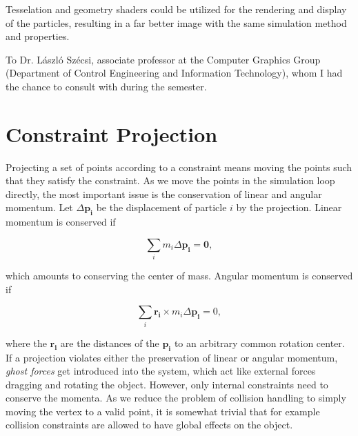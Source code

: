 \documentclass[sigplan,screen,nonacm]{acmart}
\renewcommand{\b}{\boldsymbol}
\begin{document}
Tesselation and geometry shaders could be utilized for the rendering and display
of the particles, resulting in a far better image with the same simulation
method and properties.

\begin{acks}
    To Dr. László Szécsi, associate professor at the Computer Graphics Group
    (Department of Control Engineering and Information Technology), whom I had
    the chance to consult with during the semester.
\end{acks}




\appendix

\section{Constraint Projection} \label{appendix:ConstraintProjection}
Projecting a set of points according to a constraint means moving the points
such that they satisfy the constraint. As we move the points in the
simulation loop directly, the most important issue is the conservation of linear and
angular momentum. Let $\Delta \b{p_i}$ be the displacement of particle $i$ by the
projection. Linear momentum is conserved if 

\begin{equation}
    \label{eq:linear_momentum}
    \sum\limits_{i} m_i \Delta \b{p_i} = \b{0},
\end{equation}

which amounts to conserving the center of mass. Angular momentum is conserved if

\begin{equation}
    \label{eq:angular_momentum}
    \sum\limits_{i} \b{r_i} \times m_i \Delta \b{p_i} = 0,
\end{equation}

where the $\b{r_i}$ are the distances of the $\b{p_i}$ to an arbitrary common
rotation center. If a projection violates either the preservation of 
linear or angular momentum, \emph{ghost
forces} get introduced into the system, which act like external forces dragging
and rotating the object. However, only internal constraints need to conserve the
momenta. As we reduce the problem of collision handling to simply moving the
vertex to a valid point, it is somewhat trivial that for example collision
constraints are allowed to have global effects on the object.
\end{document}
